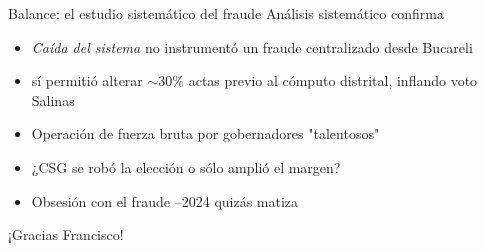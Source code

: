 \documentclass[bigger]{beamer}
\begin{document}
\begin{frame}[label={sec:orgaee2438}]{Balance: el estudio sistemático del fraude}
Análisis sistemático confirma

\begin{itemize}
\item \emph{Caída del sistema} no instrumentó un fraude centralizado desde Bucareli
\item sí permitió alterar \(\sim30\%\) actas previo al cómputo distrital, inflando voto Salinas
\item Operación de fuerza bruta por gobernadores "talentosos"
\item ¿CSG se robó la elección o sólo amplió el margen?
\item Obsesión con el \alert{fraude} --2024 quizás matiza
\end{itemize}

\pause \bigskip \centering \alert{¡Gracias Francisco!}
\end{frame}
\end{document}
